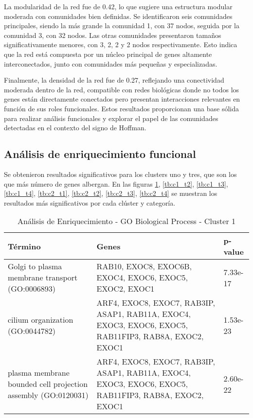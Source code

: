 La modularidad de la red fue de 0.42, lo que sugiere una estructura modular moderada con comunidades bien definidas. Se identificaron seis comunidades principales, siendo la más grande la comunidad 1, con 37 nodos, seguida por la comunidad 3, con 32 nodos. Las otras comunidades presentaron tamaños significativamente menores, con 3, 2, 2 y 2 nodos respectivamente. Esto indica que la red está compuesta por un núcleo principal de genes altamente interconectados, junto con comunidades más pequeñas y especializadas.

Finalmente, la densidad de la red fue de 0.27, reflejando una conectividad moderada dentro de la red, compatible con redes biológicas donde no todos los genes están directamente conectados pero presentan interacciones relevantes en función de sus roles funcionales. Estos resultados proporcionan una base sólida para realizar análisis funcionales y explorar el papel de las comunidades detectadas en el contexto del signo de Hoffman.


\subsection{Análisis de enriquecimiento funcional}

Se obtenieron resultados significativos para los clusters uno y tres, que son los que más número de genes albergan. En las figuras \ref{tb:c1_t1}, \ref{tb:c1_t2}, \ref{tb:c1_t3}, \ref{tb:c1_t4}, \ref{tb:c2_t1}, \ref{tb:c2_t2}, \ref{tb:c2_t3}, \ref{tb:c2_t4} se muestran los resultados más significativos por cada clúster y categoría.
\begin{table}[H]
	\centering
	\caption{Análisis de Enriquecimiento - GO Biological Process - Cluster 1}
	\label{tb:c1_t1}
	\begin{tabular}{|p{4cm}|p{4cm}|p{3cm}|}
		\hline
		\textbf{Término} & \textbf{Genes} & \textbf{p-value} \\ \hline
		Golgi to plasma membrane transport (GO:0006893) & RAB10, EXOC8, EXOC6B, EXOC4, EXOC6, EXOC5, EXOC2, EXOC1 & 7.33e-17 \\ \hline
		cilium organization (GO:0044782) & ARF4, EXOC8, EXOC7, RAB3IP, ASAP1, RAB11A, EXOC4, EXOC3, EXOC6, EXOC5, RAB11FIP3, RAB8A, EXOC2, EXOC1 & 1.53e-23 \\ \hline
		plasma membrane bounded cell projection assembly (GO:0120031) & ARF4, EXOC8, EXOC7, RAB3IP, ASAP1, RAB11A, EXOC4, EXOC3, EXOC6, EXOC5, RAB11FIP3, RAB8A, EXOC2, EXOC1 & 2.60e-22 \\ \hline
	\end{tabular}
\end{table}

